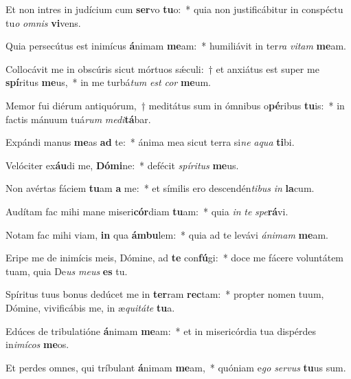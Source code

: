 \item Et non intres in judícium cum \textbf{ser}vo \textbf{tu}o:~* quia non justificábitur in conspéctu tu\textit{o} \textit{om}\textit{nis} \textbf{vi}vens.
\item Quia persecútus est inimícus \textbf{á}nimam \textbf{me}am:~* humiliávit in ter\textit{ra} \textit{vi}\textit{tam} \textbf{me}am.
\item Collocávit me in obscúris sicut mórtuos sǽculi:~† et anxiátus est super me \textbf{spí}ritus \textbf{me}us,~* in me turbá\textit{tum} \textit{est} \textit{cor} \textbf{me}um.
\item Memor fui diérum antiquórum,~† meditátus sum in ómnibus o\textbf{pé}ribus \textbf{tu}is:~* in factis mánuum tuá\textit{rum} \textit{me}\textit{di}\textbf{tá}bar.
\item Expándi manus \textbf{me}as \textbf{ad} te:~* ánima mea sicut terra si\textit{ne} \textit{a}\textit{qua} \textbf{ti}bi.
\item Velóciter ex\textbf{áu}di me, \textbf{Dó}\textbf{mi}ne:~* defécit \textit{spí}\textit{ri}\textit{tus} \textbf{me}us.
\item Non avértas fáciem \textbf{tu}am \textbf{a} me:~* et símilis ero descendén\textit{ti}\textit{bus} \textit{in} \textbf{la}cum.
\item Audítam fac mihi mane miseri\textbf{cór}diam \textbf{tu}am:~* quia \textit{in} \textit{te} \textit{spe}\textbf{rá}vi.
\item Notam fac mihi viam, \textbf{in} qua \textbf{ám}\textbf{bu}lem:~* quia ad te levávi \textit{á}\textit{ni}\textit{mam} \textbf{me}am.
\item Eripe me de inimícis meis, Dómine, ad \textbf{te} con\textbf{fú}gi:~* doce me fácere voluntátem tuam, quia De\textit{us} \textit{me}\textit{us} \textbf{es} tu.
\item Spíritus tuus bonus dedúcet me in \textbf{ter}ram \textbf{rec}tam:~* propter nomen tuum, Dómine, vivificábis me, in æ\textit{qui}\textit{tá}\textit{te} \textbf{tu}a.
\item Edúces de tribulatióne \textbf{á}nimam \textbf{me}am:~* et in misericórdia tua dispérdes in\textit{i}\textit{mí}\textit{cos} \textbf{me}os.
\item Et perdes omnes, qui tríbulant \textbf{á}nimam \textbf{me}am,~* quóniam e\textit{go} \textit{ser}\textit{vus} \textbf{tu}us sum.
